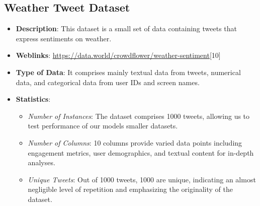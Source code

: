 \documentclass[conference]{IEEEtran}
\begin{document}
\subsection{Weather Tweet Dataset}
\begin{itemize}
    \item \textbf{Description}: This dataset is a small set of data containing tweets that express sentiments on weather.
    
    \item \textbf{Weblinks}: \url{https://data.world/crowdflower/weather-sentiment}[10]
    
    \item \textbf{Type of Data}: It comprises mainly textual data from tweets, numerical data, and categorical data from user IDs and screen names.
    
    \item \textbf{Statistics}:
    \begin{itemize}
        \item \textit{Number of Instances}: The dataset comprises 1000 tweets, allowing us to test performance of our models smaller datasets.
        \item \textit{Number of Columns}: 10 columns provide varied data points including engagement metrics, user demographics, and textual content for in-depth analyses.
        \item \textit{Unique Tweets}: Out of 1000 tweets, 1000 are unique, indicating an almost negligible level of repetition and emphasizing the originality of the dataset.

    \end{itemize}
\end{itemize}
\end{document}
